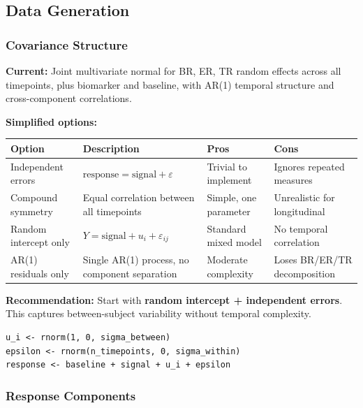 \documentclass[11pt,letterpaper]{article}
\begin{document}
\subsection{Data Generation}

\subsubsection{Covariance Structure}

\textbf{Current:} Joint multivariate normal for BR, ER, TR random
effects across all timepoints, plus biomarker and baseline, with AR(1)
temporal structure and cross-component correlations.

\textbf{Simplified options:}

\begin{table}[h]
\centering\small
\begin{tabular}{@{}L{3cm}L{4cm}L{3cm}L{3.5cm}@{}}
\toprule
Option & Description & Pros & Cons \\
\midrule
Independent errors & $\text{response} = \text{signal} + \varepsilon$ & Trivial to implement & Ignores repeated measures \\
Compound symmetry & Equal correlation between all timepoints & Simple, one parameter & Unrealistic for longitudinal \\
Random intercept only & $Y = \text{signal} + u_i + \varepsilon_{ij}$ & Standard mixed model & No temporal correlation \\
AR(1) residuals only & Single AR(1) process, no component separation & Moderate complexity & Loses BR/ER/TR decomposition \\
\bottomrule
\end{tabular}
\end{table}

\textbf{Recommendation:} Start with \textbf{random intercept +
independent errors}. This captures between-subject variability without
temporal complexity.

\begin{Verbatim}[fontsize=\small]
u_i <- rnorm(1, 0, sigma_between)
epsilon <- rnorm(n_timepoints, 0, sigma_within)
response <- baseline + signal + u_i + epsilon
\end{Verbatim}

\subsubsection{Response Components}
\end{document}
